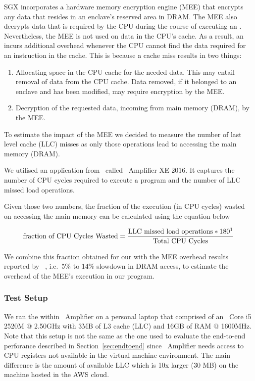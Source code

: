 \documentclass[../../../main.tex]{subfiles}
\begin{document}
\label{sec:mem-analysis}
SGX incorporates a hardware memory encryption engine (MEE) that encrypts any
data that resides in an enclave's reserved area in DRAM. The MEE also decrypts
data that is required by the CPU during the course of executing an
\enclaveprogram. Nevertheless, the MEE is not used on data in the CPU's cache.
As a result, an \enclaveprogram incurs additional overhead whenever the CPU
cannot find the data required for an instruction in the cache. This is because
a cache miss results in two things:
\begin{enumerate}
  \item Allocating space in the CPU cache for the needed data. This may entail
    removal of data from the CPU cache. Data removed, if it belonged to an
    enclave and has been modified, may require encryption by the MEE.
  \item Decryption of the requested data, incoming from main memory (DRAM), by
    the MEE.
\end{enumerate}

To estimate the impact of the MEE we decided to measure the number of last
level cache (LLC) misses as only those operations lead to accessing the main
memory (DRAM).

We utilised an application from \Intel~called \VTune~Amplifier XE 2016. It
captures the number of CPU cycles required to execute a program and the number
of LLC missed load operations. 

Given those two numbers, the fraction of the \enclaveprogram execution (in CPU
cycles) wasted on accessing the main memory can be calculated using the
equation below~\cite{intel-eqn}

\begin{align*}
 \text{fraction of CPU Cycles Wasted} = 
    \frac{\text{LLC missed load operations} * 180\footnotemark}
      {\text{Total CPU Cycles}}
\end{align*}


We combine this fraction obtained for our \busywait with the MEE overhead
results reported by \Intel~\cite{REFERENCE}, i.e.\ 5\% to 14\% slowdown in
DRAM access, to estimate the overhead of the MEE's execution in our program. 

\subsubsection*{Test Setup}
We ran the \enclavemodel within \VTune~Amplifier on a personal laptop that
comprised of an \Intel~Core i5 2520M @ 2.50GHz with 3MB of L3 cache (LLC) and
16GB of RAM @ 1600MHz. Note that this setup is not the same as the one used to
evaluate the end-to-end perforance described in Section~\ref{sec:endtoend}
since \VTune~Amplifier needs access to CPU registers not available in the
virtual machine environment. The main difference is the amount of available
LLC which is 10x larger (30 MB) on the machine hosted in the AWS cloud.
\end{document}
